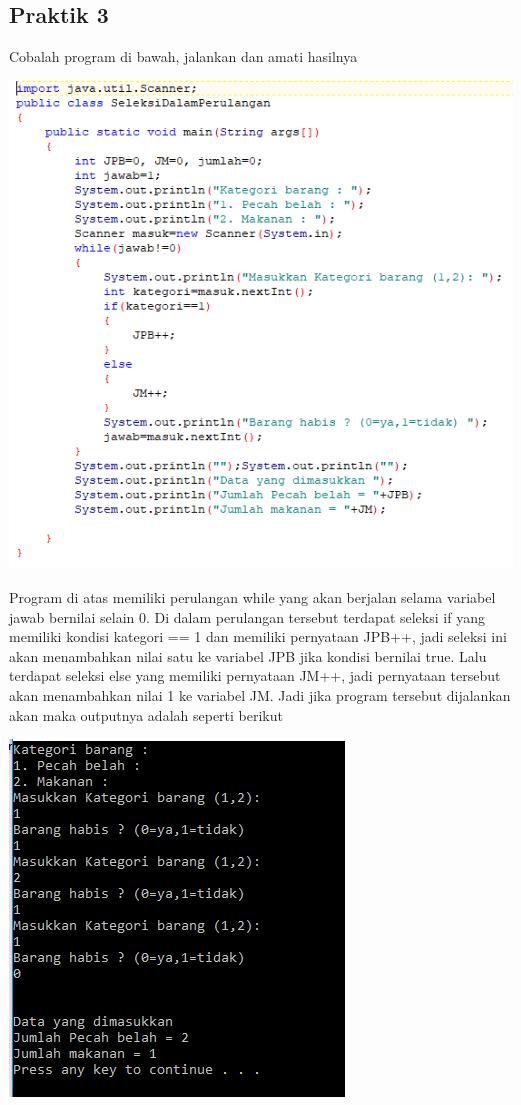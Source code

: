\documentclass[a4paper,12pt]{article}
\begin{document}
\subsection{Praktik 3}
Cobalah program di bawah, jalankan dan amati hasilnya\\
\begin{center}
    \includegraphics[scale=.8]{image5}
\end{center}
Program di atas memiliki perulangan while yang akan berjalan selama variabel jawab bernilai selain 0. Di dalam perulangan tersebut terdapat seleksi if yang memiliki kondisi kategori == 1 dan memiliki pernyataan JPB++, jadi seleksi ini akan menambahkan nilai satu ke variabel JPB jika kondisi bernilai true. Lalu terdapat seleksi else yang memiliki pernyataan JM++, jadi pernyataan tersebut akan menambahkan nilai 1 ke variabel JM. Jadi jika program tersebut dijalankan akan maka outputnya adalah seperti berikut
\begin{center}
    \includegraphics[scale=1]{image6}
\end{center}
\end{document}
